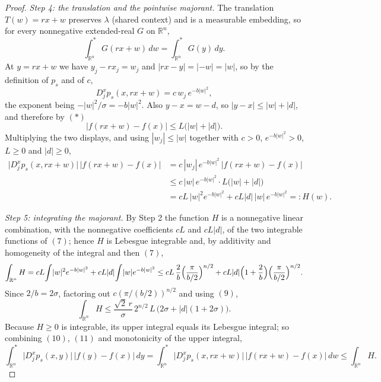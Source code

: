 \begin{proof}
\emph{Step 4: the translation and the pointwise majorant.}
The translation $T(w) = rx+w$ preserves $\lambda$ (shared context) and is a measurable
embedding, so for every nonnegative extended-real $G$ on $\mathbb{R}^n$,
\begin{equation*}
  \int^*_{\mathbb{R}^n} G(rx+w)\,dw = \int^*_{\mathbb{R}^n} G(y)\,dy . \tag{10}
\end{equation*}
At $y = rx+w$ we have $y_j - rx_j = w_j$ and $|rx-y| = |{-w}| = |w|$, so by the
definition of $p_s$ and of $c$,
\[
  D_j^xp_s(x,rx+w) = c\,w_j\,e^{-b|w|^2} ,
\]
the exponent being $-|w|^2/\sigma = -b|w|^2$.  Also $y-x = w-d$, so
$|y-x| \leq |w|+|d|$, and therefore by $(*)$
\[
  |f(rx+w)-f(x)| \leq L\bigl(|w|+|d|\bigr) .
\]
Multiplying the two displays, and using $|w_j| \leq |w|$ together with $c > 0$,
$e^{-b|w|^2} > 0$, $L \geq 0$ and $|d| \geq 0$,
\begin{align*}
  \bigl|D_j^xp_s(x,rx+w)\bigr|\,|f(rx+w)-f(x)|
    &= c\,|w_j|\,e^{-b|w|^2}\,|f(rx+w)-f(x)|\\
    &\leq c\,|w|\,e^{-b|w|^2}\cdot L\bigl(|w|+|d|\bigr)\\
    &= cL\,|w|^2e^{-b|w|^2} + cL|d|\,|w|\,e^{-b|w|^2} =: H(w) . \tag{11}
\end{align*}

\emph{Step 5: integrating the majorant.}
By Step 2 the function $H$ is a nonnegative linear combination, with the nonnegative
coefficients $cL$ and $cL|d|$, of the two integrable functions of $(7)$; hence $H$ is
Lebesgue integrable and, by additivity and homogeneity of the integral and then $(7)$,
\[
  \int_{\mathbb{R}^n}H
    = cL\!\int\!|w|^2e^{-b|w|^2} + cL|d|\!\int\!|w|e^{-b|w|^2}
    \leq cL\,\frac2b\Bigl(\frac{\pi}{b/2}\Bigr)^{n/2}
       + cL|d|\Bigl(1+\frac2b\Bigr)\Bigl(\frac{\pi}{b/2}\Bigr)^{n/2} .
\]
Since $2/b = 2\sigma$, factoring out $c(\pi/(b/2))^{n/2}$ and using $(9)$,
\begin{equation*}
  \int_{\mathbb{R}^n}H
    \leq \frac{\sqrt2\,r}{\sigma}\,2^{n/2}\,L\,
      \bigl(2\sigma + |d|(1+2\sigma)\bigr) . \tag{12}
\end{equation*}
Because $H \geq 0$ is integrable, its upper integral equals its Lebesgue integral; so
combining $(10)$, $(11)$ and monotonicity of the upper integral,
\begin{equation*}
  \int^*_{\mathbb{R}^n}\bigl|D_j^xp_s(x,y)\bigr|\,|f(y)-f(x)|\,dy
    = \int^*_{\mathbb{R}^n}\bigl|D_j^xp_s(x,rx+w)\bigr|\,|f(rx+w)-f(x)|\,dw
    \leq \int_{\mathbb{R}^n}H . \tag{13}
\end{equation*}


\end{proof}
